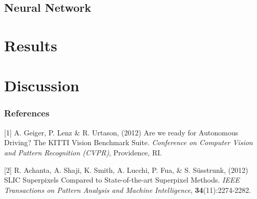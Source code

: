 \documentclass{article} %
\begin{document}
\subsection{Neural Network}

\section{Results}

\section{Discussion}

\subsubsection*{References}

% 
% 
\small{
[1] A. Geiger, P. Lenz \& R. Urtason, (2012) Are we ready for Autonomous Driving? The KITTI Vision Benchmark Suite. {\it Conference on Computer Vision and Pattern Recognition (CVPR)}, Providence, RI.

[2] R. Achanta, A. Shaji, K. Smith, A. Lucchi, P. Fua, \& S. Süsstrunk, (2012) SLIC Superpixels Compared to State-of-the-art Superpixel Methods. {\it IEEE Transactions on Pattern Analysis and Machine Intelligence}, {\bf 34}(11):2274-2282.

}
\end{document}
